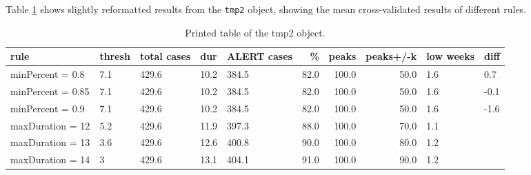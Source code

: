 \documentclass[11pt]{article}\usepackage[]{graphicx}\usepackage[]{color}
\begin{document}
Table \ref{tab:robust} shows slightly reformatted results from the {\tt tmp2} object, showing the mean cross-validated results of different rules.
\begin{table}[ht]
\centering
\caption{Printed table of the tmp2 object.} 
\label{tab:robust}
\begin{tabular}{lllllrrrll}
 rule & thresh & total cases & dur & ALERT cases & \% & peaks & peaks+/-k & low weeks & diff \\ 
  \hline
minPercent = 0.8 & 7.1 & 429.6 & 10.2 & 384.5 & 82.0 & 100.0 & 50.0 & 1.6 & 0.7 \\ 
  minPercent = 0.85 & 7.1 & 429.6 & 10.2 & 384.5 & 82.0 & 100.0 & 50.0 & 1.6 & -0.1 \\ 
  minPercent = 0.9 & 7.1 & 429.6 & 10.2 & 384.5 & 82.0 & 100.0 & 50.0 & 1.6 & -1.6 \\ 
  maxDuration = 12 & 5.2 & 429.6 & 11.9 & 397.3 & 88.0 & 100.0 & 70.0 & 1.1 &  \\ 
  maxDuration = 13 & 3.6 & 429.6 & 12.6 & 400.8 & 90.0 & 100.0 & 80.0 & 1.2 &  \\ 
  maxDuration = 14 & 3 & 429.6 & 13.1 & 404.1 & 91.0 & 100.0 & 90.0 & 1.2 &  \\ 
   \hline
\end{tabular}
\end{table}
\end{document}
